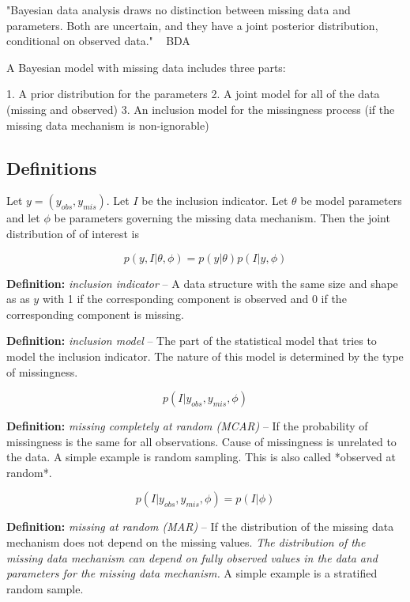 \documentclass[11pt]{article}
\begin{document}
"Bayesian data analysis draws no distinction between missing data and parameters. Both are uncertain, and they have a joint posterior distribution, conditional on observed data." ~ BDA

A Bayesian model with missing data includes three parts:

1. A prior distribution for the parameters
2. A joint model for all of the data (missing and observed)
3. An inclusion model for the missingness process (if the missing data mechanism is non-ignorable)

\subsection{Definitions}

Let $y = (y_{obs}, y_{mis})$. Let $I$ be the inclusion indicator. Let $\theta$ be model parameters and let $\phi$ be parameters governing the missing data mechanism. Then the joint distribution of of interest is 

$$p(y, I|\theta, \phi) = p(y|\theta)p(I|y, \phi)$$

\vspace{0.25in}

\textbf{Definition:} \textit{inclusion indicator} -- A data structure with the same size and shape as as $y$ with 1 if the corresponding component is observed and 0 if the corresponding component is missing.

\vspace{0.25in}

\textbf{Definition:} \textit{inclusion model} -- The part of the statistical model that tries to model the inclusion indicator. The nature of this model is determined by the type of missingness. 

$$p(I|y_{obs}, y_{mis}, \phi)$$

\vspace{0.25in}

\textbf{Definition:} \textit{missing completely at random (MCAR)} -- If the probability of missingness is the same for all observations. Cause of missingness is unrelated to the data. A simple example is random sampling. This is also called *observed at random*.

$$p(I|y_{obs}, y_{mis}, \phi) = p(I| \phi)$$


\vspace{0.25in}

\textbf{Definition:} \textit{missing at random (MAR)} -- If the distribution of the missing data mechanism does not depend on the missing values. \textit{The distribution of the missing data mechanism can depend on fully observed values in the data and parameters for the missing data mechanism.} A simple example is a stratified random sample. 
\end{document}
